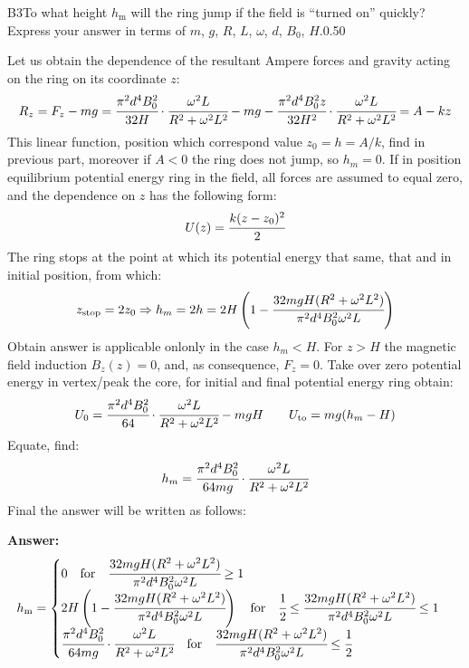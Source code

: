 \documentclass[11pt,a4paper]{article}
\begin{document}
\begin{solcard}{B3}{To what height $h_\mathrm m$ will the ring jump if the field is “turned on” quickly? Express your answer in terms of $m$, $g$, $R$, $L$, $\omega$, $d$, $B_0$, $H$.}{0.50}

Let us obtain the dependence of the resultant Ampere forces and gravity acting on the ring on its coordinate $z$: $$R_z=F_z-mg=\cfrac{\pi^2d^4B^2_0}{32H}\cdot\cfrac{\omega^2L}{R^2+\omega^2L^2}-mg-\cfrac{\pi^2d^4B^2_0z}{32H^2}\cdot\cfrac{\omega^2L}{R^2+\omega^2L^2}=A-kz $$This linear function, position which correspond value $z_0=h=A/k$, find in previous part, moreover if $A<0$ the ring does not jump, so $h_m=0$. If in position equilibrium potential energy ring in the field, all forces are assumed to equal zero, and the dependence on $z$ has the following form: $$U(z)=\cfrac{k(z-z_0)^2}{2} $$The ring stops at the point at which its potential energy that same, that and in initial position, from which: $$z_\text{stop}=2z_0\Rightarrow h_m=2h=2H\left(1-\cfrac{32mgH(R^2+\omega^2L^2)}{\pi^2d^4B^2_0\omega^2L}\right) $$Obtain answer is applicable onlonly in the case $h_m < H$. For $z > H$ the magnetic field induction $B_z(z) = 0$, and, as consequence, $F_z=0$. Take over zero potential energy in vertex/peak the core, for initial and final potential energy ring obtain: $$U_0=\cfrac{\pi^2d^4B^2_0}{64}\cdot\cfrac{\omega^2L}{R^2+\omega^2L^2}-mgH\qquad U_\text{to}=mg(h_m-H) $$Equate, find: $$h_m=\cfrac{\pi^2d^4B^2_0}{64mg}\cdot\cfrac{\omega^2L}{R^2+\omega^2L^2} $$Final the answer will be written as follows:

\par\smallskip\noindent\textbf{Answer:} $$h_\mathrm m=\begin{cases} 0\quad \text{for}\quad \cfrac{32mgH(R^2+\omega^2L^2)}{\pi^2d^4B^2_0\omega^2L}\geq 1\\ 2H\left(1-\cfrac{32mgH(R^2+\omega^2L^2)}{\pi^2d^4B^2_0\omega^2L}\right)\quad \text{for}\quad \cfrac{1}{2}\leq \cfrac{32mgH(R^2+\omega^2L^2)}{\pi^2d^4B^2_0\omega^2L}\leq 1\\ \cfrac{\pi^2d^4B^2_0}{64mg}\cdot\cfrac{\omega^2L}{R^2+\omega^2L^2}\quad\text{for}\quad \cfrac{32mgH(R^2+\omega^2L^2)}{\pi^2d^4B^2_0\omega^2L}\leq\cfrac{1}{2} \end{cases} $$
\end{solcard}
\end{document}
